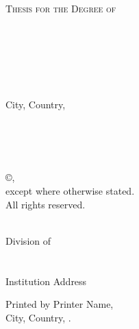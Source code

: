 
\thispagestyle{empty}
\begin{center}
  \textsc{Thesis for the Degree of \degreetitle}\\
\end{center}

\vspace{4cm}

\begin{center}
  {\LARGE \textbf{\mytitle}}\\
  \ifx\mysubtitle\undefined
  \else
    \vspace{4mm}
    \textit{\large\mysubtitle}
  \fi
\end{center}

\ifx\mysubtitle\undefined
\vspace{5mm}
\else
\vspace{2mm}
\fi

\begin{center}
\textsc{\large\authorname} \\
\end{center}

\vfill

\begin{center}
\textit{\mydepartment}\\
\textsc{\chalIgu}\\
City, Country, \currentyear \\
\end{center}

\newpage
\thispagestyle{empty}

\vspace{2cm} \noindent \textbf
\mytitle\\
\ifx\mysubtitle\undefined
\else
  \textit{\small\mysubtitle}
  \\
\fi

\noindent
\textsc{\authorname}\\

\vskip 0.5cm\noindent
\copyright \space \authorname,~\currentyear  \\
\noindent
except where otherwise stated. \\
All rights reserved. \vspace{1cm}

\vfill

\noindent \identifierNoText

\noindent
\mydepartment\\
Division of \division\\
\ifx\researchgroup\undefined\else\researchgroup\\\fi
\chalIgu\\
Institution Address\\

\vskip 1.5cm

\noindent
Printed by Printer Name,\\
City, Country, \currentyear.

